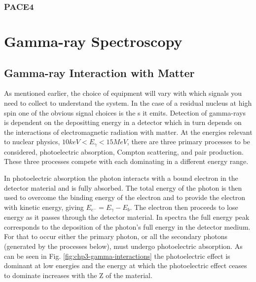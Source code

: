 \subsubsection{PACE4}
\label{sssec:exp-pr-fus-evap-beam-pace4}

\section{Gamma-ray Spectroscopy}
\label{sec:exp-pr-gamma-spec}
\subsection{Gamma-ray Interaction with Matter}
\label{ssec:exp-pr-gamma-spec-interactions}
As mentioned earlier, the choice of equipment will vary with which signals you need to collect to understand the system. In the case of a residual nucleus at high spin one of the obvious signal choices is the \gr{}s it emits. Detection of gamma-rays is dependent on the \gr{} depositting energy in a detector which in turn depends on the interactions of electromagnetic radiation with matter. At the energies relevant to nuclear physics, $10keV<E_{\gamma}<15MeV$, there are three primary processes to be considered, photoelectric absorption, Compton scattering, and pair production. These three processes compete with each dominating in a different energy range.

In photoelectric absorption the photon interacts with a bound electron in the detector material and is fully absorbed\cite{einstein-PE}. The total energy of the photon is then used to overcome the binding energy of the electron and to provide the electron with kinetic energy, giving $E_{e^-}=E_{\gamma}-E_b$. The electron then proceeds to lose energy as it passes through the detector material. In \gr{} spectra the full energy peak corresponds to the deposition of the photon's full energy in the detector medium. For that to occur either the primary photon, or all the secondary photons (generated by the processes below), must undergo photoelectric absorption. As can be seen in Fig. \ref{fig:chp3-gamma-interactions} the photoelectric effect is dominant at low energies and the energy at which the photoelectric effect ceases to dominate increases with the Z of the material.


